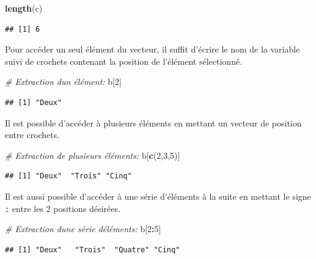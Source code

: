 \documentclass[
]{book}
\newenvironment{Shaded}{\begin{snugshade}}{\end{snugshade}}
\newcommand{\CommentTok}[1]{\textcolor[rgb]{0.56,0.35,0.01}{\textit{#1}}}
\newcommand{\DecValTok}[1]{\textcolor[rgb]{0.00,0.00,0.81}{#1}}
\newcommand{\FunctionTok}[1]{\textcolor[rgb]{0.13,0.29,0.53}{\textbf{#1}}}
\newcommand{\NormalTok}[1]{#1}
\newcommand{\SpecialCharTok}[1]{\textcolor[rgb]{0.81,0.36,0.00}{\textbf{#1}}}
\begin{document}
\begin{Shaded}
\begin{Highlighting}[]
\FunctionTok{length}\NormalTok{(c)}
\end{Highlighting}
\end{Shaded}

\begin{verbatim}
## [1] 6
\end{verbatim}

Pour accéder un seul élément du vecteur, il suffit d'écrire le nom de la variable suivi de crochets contenant la position de l'élément sélectionné.

\begin{Shaded}
\begin{Highlighting}[]
\CommentTok{\# Extraction d\textquotesingle{}un élément:}
\NormalTok{b[}\DecValTok{2}\NormalTok{]}
\end{Highlighting}
\end{Shaded}

\begin{verbatim}
## [1] "Deux"
\end{verbatim}

Il est possible d'accéder à plusieurs éléments en mettant un vecteur de position entre crochets.

\begin{Shaded}
\begin{Highlighting}[]
\CommentTok{\# Extraction de plusieurs éléments:}
\NormalTok{b[}\FunctionTok{c}\NormalTok{(}\DecValTok{2}\NormalTok{,}\DecValTok{3}\NormalTok{,}\DecValTok{5}\NormalTok{)]}
\end{Highlighting}
\end{Shaded}

\begin{verbatim}
## [1] "Deux"  "Trois" "Cinq"
\end{verbatim}

Il est aussi possible d'accéder à une série d'éléments à la suite en mettant le signe \texttt{:} entre les 2 positions désirées.

\begin{Shaded}
\begin{Highlighting}[]
\CommentTok{\# Extraction d\textquotesingle{}une série d\textquotesingle{}éléments:}
\NormalTok{b[}\DecValTok{2}\SpecialCharTok{:}\DecValTok{5}\NormalTok{]}
\end{Highlighting}
\end{Shaded}

\begin{verbatim}
## [1] "Deux"   "Trois"  "Quatre" "Cinq"
\end{verbatim}
\end{document}
